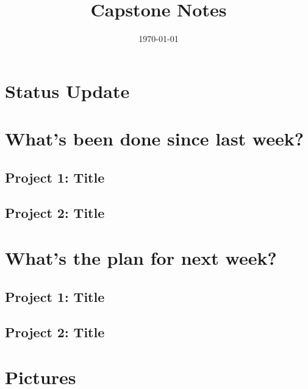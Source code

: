 \documentclass[a4paper, 10pt]{article}
\title{Capstone Notes}
\date{\today}
\begin{document}
\maketitle

\section*{Status Update}

\section*{What's been done since last week?}
	\subsection*{Project 1: Title}
	\subsection*{Project 2: Title}

\section*{What's the plan for next week?}
	\subsection*{Project 1: Title}
	\subsection*{Project 2: Title}
	
\section*{Pictures}
	
\end{document}

